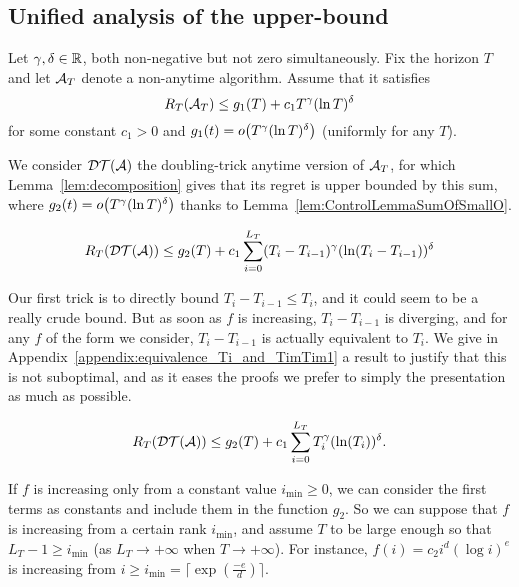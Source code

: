 \documentclass[12pt]{colt2018} %
\begin{document}
\subsection{Unified analysis of the upper-bound}

Let $\gamma,\delta\in\mathbb{R}$, both non-negative but not zero simultaneously.
Fix the horizon $T$ and let $\mathcal{A}_T$ denote a non-anytime algorithm.
Assume that it satisfies
\[R_T(\mathcal{A}_T) \leq g_1(T) + c_1 T^{\gamma} (\ln T)^{\delta}\]
for some constant $c_1 > 0$ and $g_1(t) = \mathop{}\mathopen{}o\mathopen{}\left(T^{\gamma} (\ln T)^{\delta}\right)$ (uniformly for any $T$).

We consider $\mathcal{DT}(\mathcal{A})$ the doubling-trick anytime version of $\mathcal{A}_T$,
for which Lemma~\ref{lem:decomposition} gives that
its regret is upper bounded by this sum,
where $g_2(t) = \mathop{}\mathopen{}o\mathopen{}\left(T^{\gamma} (\ln T)^{\delta}\right)$
thanks to Lemma~\ref{lem:ControlLemmaSumOfSmallO}.

\begin{equation}
    R_T(\mathcal{DT}(\mathcal{A})) \leq g_2(T) +  c_1 \sum_{i=0}^{L_T} (T_i - T_{i-1})^{\gamma} (\ln(T_i - T_{i-1}))^{\delta}
\end{equation}

Our first trick is to directly bound $T_i - T_{i-1} \leq T_i$, and it could seem to be a really crude bound.
But as soon as $f$ is increasing, $T_i - T_{i-1}$ is diverging, and for any $f$ of the form we consider, $T_i - T_{i-1}$ is actually equivalent to $T_i$.
We give in Appendix~\ref{appendix:equivalence_Ti_and_TimTim1} a result to justify that this is not suboptimal, and as it eases the proofs we prefer to simply the presentation as much as possible.


\begin{equation}
    R_T(\mathcal{DT}(\mathcal{A})) \leq g_2(T) +  c_1 \sum_{i=0}^{L_T} T_i^{\gamma} (\ln(T_i))^{\delta}.
\end{equation}

If $f$ is increasing only from a constant value $i_{\min} \geq 0$, we can consider the first terms as constants and include them in the function $g_2$.
So we can suppose that $f$ is increasing from a certain rank $i_{\min}$, and assume $T$ to be large enough so that $L_T - 1 \geq i_{\min}$ (as $L_T \to+\infty$ when $T\to+\infty$).
For instance, $f(i) = c_2 i^d (\log i)^e$ is increasing from $i \geq i_{\min} = \lceil \exp(\frac{-e}{d})\rceil$.
\end{document}

